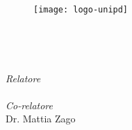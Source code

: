 
\begin{titlepage}

\begin{center}

\begin{LARGE}
\textbf{\myUni}\\
\end{LARGE}

\vspace{10pt}

\begin{Large}
\textsc{\myDepartment}\\
\end{Large}

\vspace{10pt}

\begin{large}
\textsc{\myFaculty}\\
\end{large}

\vspace{20pt}
\begin{figure}[htbp]
\begin{center}
\texttt{[image: logo-unipd]}
\end{center}
\end{figure}
\vspace{20pt} 

\begin{LARGE}
\begin{center}
\textbf{\myTitle}\\
\end{center}
\end{LARGE}

\vspace{12pt} 

\begin{large}
\textsl{\myDegree}\\
\end{large}

\vspace{26pt} 

\begin{large}
\begin{flushleft}
\textit{Relatore}\\ 
\vspace{5pt} 
\profTitle \myProf\\
\vspace{5pt} 
\textit{Co-relatore}\\ 
\vspace{5pt} 
{Dr. Mattia Zago}
\end{flushleft}


\end{large}
\end{center}
\end{titlepage}
